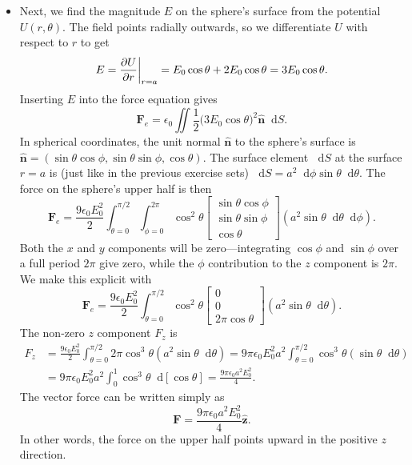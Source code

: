 \documentclass[11pt, a4paper]{article}
\newcommand{\diff}{\mathop{}\!\mathrm{d}} %
\renewcommand{\vec}[1]{\bm{#1}} %
\newcommand{\uvec}[1]{\hat{\vec{#1}}} %
\newcommand{\ee}{\epsilon_{0}}  %
\begin{document}
\begin{itemize}
	\item Next, we find the magnitude $ E $ on the sphere's surface from the potential $ U(r, \theta) $. The field points radially outwards, so we differentiate $ U $ with respect to $ r $ to get
	\begin{equation*}
		E = \pdv{U}{r} \bigg |_{r = a} = E_{0} \cos \theta + 2 E_{0} \cos \theta = 3E_{0} \cos \theta.
	\end{equation*}
	Inserting $ E $ into the force equation gives
	\begin{equation*}
		\vec{F}_{e} = \ee \iint \frac{1}{2}\big(3E_{0} \cos \theta\big)^{2} \uvec{n} \diff S.
	\end{equation*}
	In spherical coordinates, the unit normal $ \uvec{n} $ to the sphere's surface is $ \uvec{n} = (\sin \theta \cos \phi, \sin \theta \sin \phi, \cos \theta) $. The surface element $ \diff S $ at the surface $ r = a $ is (just like in the previous exercise sets) $ \diff S = a^{2} \diff \phi \sin \theta \diff \theta $. The force on the sphere's upper half is then
	\begin{equation*}
		\vec{F}_{e} = \frac{9\ee E_{0}^{2}}{2} \int_{\theta = 0}^{\pi/2}\int_{\phi = 0}^{2\pi} \cos^{2} \theta 
		\begin{bmatrix}
			\sin \theta \cos \phi\\
			\sin \theta \sin \phi\\
			\cos \theta
		\end{bmatrix}
		(a^{2} \sin \theta \diff \theta \diff \phi).
	\end{equation*}
	Both the $ x $ and $ y $ components will be zero---integrating $ \cos \phi $ and $ \sin \phi $ over a full period $ 2 \pi $ give zero, while the $ \phi $ contribution to the $ z $ component is $ 2\pi $.  We make this explicit with
	\begin{equation*}
		\vec{F}_{e} = \frac{9\ee E_{0}^{2}}{2} \int_{\theta = 0}^{\pi/2}\cos^{2} \theta 
		\begin{bmatrix}
			0\\
			0\\
			2\pi \cos \theta 
		\end{bmatrix}
		(a^{2} \sin \theta \diff \theta) .
	\end{equation*}
	The non-zero $ z $ component $ F_{z} $ is 
	\begin{align*}
		F_{z} &= \frac{9\ee E_{0}^{2}}{2} \int_{\theta = 0}^{\pi/2}2\pi \cos^{3} \theta (a^{2} \sin \theta \diff \theta) = 9\pi\ee E_{0}^{2}a^{2} \int_{\theta = 0}^{\pi/2} \cos^{3} \theta (\sin \theta \diff \theta)\\
		& =  9\pi\ee E_{0}^{2}a^{2} \int_{0}^{1} \cos^{3} \theta \diff [\cos \theta] = \frac{9\pi\ee a^{2} E_{0}^{2}}{4}.
	\end{align*}
	The vector force can be written simply as
	\begin{equation*}
		\vec{F} = \frac{9\pi\ee a^{2} E_{0}^{2}}{4} \uvec{z}.
	\end{equation*}
	In other words, the force on the upper half points upward in the positive $ z $ direction.	
	
\end{itemize}
\end{document}

